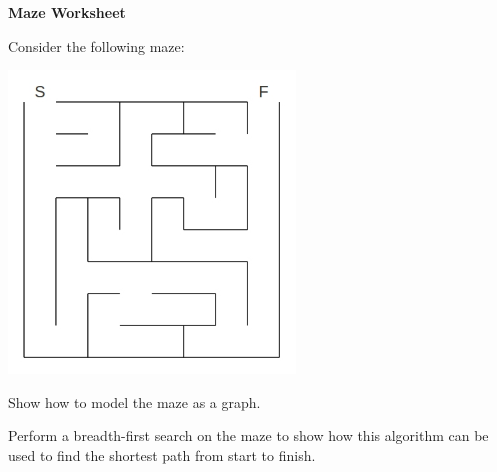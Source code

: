 \documentclass[12pt]{article}
\begin{document}
\newcommand{\lsp}[1]{\large\renewcommand{\baselinestretch}{#1}\normalsize}

\lsp{1}
\pagestyle{plain}
\begin{center}
{\bf
Maze Worksheet
}
\end{center}

\begin{flushleft}
   Consider the following maze:
\end{flushleft}

\begin{center}
   \includegraphics[width=3in]{./maze.jpg}
\end{center}
\begin{flushleft}
   Show how to model the maze as a graph.
\end{flushleft}

\vspace*{3.5in}

\begin{flushleft}
   Perform a breadth-first search on the maze to show how this algorithm can be used to find the shortest path from start to finish.
\end{flushleft}
\end{document}
